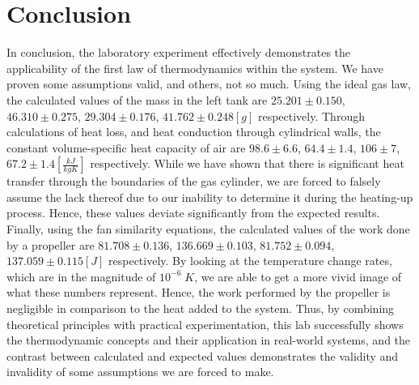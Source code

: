 \documentclass[12pt]{article}
\begin{document}
\section*{Conclusion}
In conclusion, the laboratory experiment effectively demonstrates the applicability of the first law of thermodynamics within the system. We have proven some assumptions valid, and others, not so much. 
Using the ideal gas law, the calculated values of the mass in the left tank are $25.201\pm0.150$, $46.310\pm0.275$, $29.304\pm0.176$, $41.762\pm0.248[g]$ respectively. Through calculations of heat loss, and heat conduction through cylindrical walls, the constant volume-specific heat capacity of air are $98.6\pm6.6$, $64.4\pm1.4$, $106\pm7$, $67.2\pm1.4[\frac{kJ}{kgK}]$ respectively. While we have shown that there is significant heat transfer through the boundaries of the gas cylinder, we are forced to falsely assume the lack thereof due to our inability to determine it during the heating-up process. Hence, these values deviate significantly from the expected results. Finally, using the fan similarity equations, the calculated values of the work done by a propeller are $81.708\pm0.136$, $136.669\pm0.103$, $81.752\pm0.094$, $137.059\pm0.115[J]$ respectively. By looking at the temperature change rates, which are in the magnitude of $10^{-6}\;K$, we are able to get a more vivid image of what these numbers represent.
Hence, the work performed by the propeller is negligible in comparison to the heat added to the system. Thus, by combining theoretical principles with practical experimentation, this lab successfully shows the thermodynamic concepts and their application in real-world systems, and the contrast between calculated and expected values demonstrates the validity and invalidity of some assumptions we are forced to make.

\newpage
\printbibliography
\end{document}
